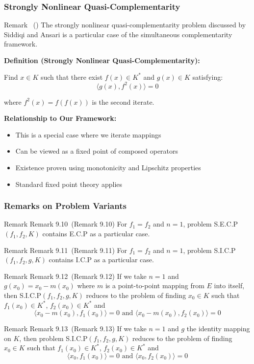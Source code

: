 \documentclass[aspectratio=169,10pt]{beamer}
\newenvironment{remark}[1][]{\begin{block}{Remark \ifx\relax#1\relax\else~(#1)\fi}}{\end{block}}
\begin{document}
\begin{frame}
\frametitle{Strongly Nonlinear Quasi-Complementarity}

\begin{remark}
The strongly nonlinear quasi-complementarity problem discussed by Siddiqi and Ansari is
a particular case of the simultaneous complementarity framework.
\end{remark}

\vspace{0.3cm}

\textbf{Definition (Strongly Nonlinear Quasi-Complementarity):}

Find $x \in K$ such that there exist $f(x) \in K^*$ and $g(x) \in K$ satisfying:
$$\langle g(x), f^2(x) \rangle = 0$$

where $f^2(x) = f(f(x))$ is the second iterate.

\vspace{0.3cm}

\textbf{Relationship to Our Framework:}
\begin{itemize}
    \item This is a special case where we iterate mappings
    \item Can be viewed as a fixed point of composed operators
    \item Existence proven using monotonicity and Lipschitz properties
    \item Standard fixed point theory applies
\end{itemize}

\end{frame}

\begin{frame}
\frametitle{Remarks on Problem Variants}

\begin{remark}[Remark 9.10]
For $f_1 = f_2$ and $n = 1$, problem S.E.C.P$(f_1, f_2, K)$ contains
E.C.P as a particular case.
\end{remark}

\begin{remark}[Remark 9.11]
For $f_1 = f_2$ and $n = 1$, problem S.I.C.P$(f_1, f_2, g, K)$ contains
I.C.P as a particular case.
\end{remark}

\begin{remark}[Remark 9.12]
If we take $n = 1$ and $g(x_0) = x_0 - m(x_0)$ where $m$ is a point-to-point
mapping from $E$ into itself, then S.I.C.P$(f_1, f_2, g, K)$ reduces to the problem
of finding $x_0 \in K$ such that $f_1(x_0) \in K^*$, $f_2(x_0) \in K^*$ and
$$\langle x_0 - m(x_0), f_1(x_0) \rangle = 0 \text{ and } \langle x_0 - m(x_0), f_2(x_0) \rangle = 0$$
\end{remark}

\begin{remark}[Remark 9.13]
If we take $n = 1$ and $g$ the identity mapping on $K$, then problem
S.I.C.P$(f_1, f_2, g, K)$ reduces to the problem of finding $x_0 \in K$ such that
$f_1(x_0) \in K^*$, $f_2(x_0) \in K^*$ and
$$\langle x_0, f_1(x_0) \rangle = 0 \text{ and } \langle x_0, f_2(x_0) \rangle = 0$$
\end{remark}

\end{frame}
\end{document}
